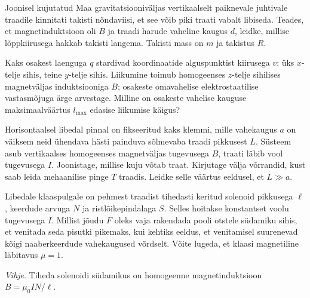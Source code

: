 \documentclass[10pt]{article}
\begin{document}
{Joonisel kujutatud Maa gravitatsiooniväljas vertikaalselt paiknevale juhtivale traadile kinnitati takisti nõndaviisi, et see võib piki traati vabalt libiseda. Teades, et magnetinduktsioon oli $B$ ja traadi harude vaheline kaugus $d$, leidke, millise lõppkiirusega hakkab takisti langema. Takisti mass on $m$ ja takistus $R$.
\probend
\bigskip


Kaks osakest laenguga $q$ stardivad koordinaatide alguspunktist kiirusega $v$:
üks $x$-telje sihis, teine $y$-telje sihis.
Liikumine toimub homogeenses $z$-telje sihilises magnetväljas induktsiooniga
$B$; osakeste omavahelise
elektrostaatilise vastasmõjuga ärge arvestage. Milline on osakeste vahelise
kauguse maksimaalväärtus $l_{\max}$ edasise liikumise käigus?
\probend
\bigskip


Horisontaalsel libedal pinnal on fikseeritud kaks klemmi, mille vahekaugus $a$ on väiksem neid ühendava hästi painduva sõlmevaba traadi pikkusest $L$. Süsteem asub vertikaalses homogeenses magnetväljas tugevusega $B$, traati läbib vool tugevusega $I$. Joonistage, millise kuju võtab traat. Kirjutage välja võrrandid, kust saab leida mehaanilise pinge $T$ traadis. Leidke selle väärtus eeldusel, et $L \gg a$.
\probend
\bigskip


Libedale klaaspulgale on pehmest traadist tihedasti keritud solenoid pikkusega $\ell$, keerdude arvuga $N$ ja ristlõikepindalaga $S$. Selles hoitakse konstantset voolu tugevusega $I$. Millist jõudu $F$ oleks vaja rakendada pooli otstele südamiku sihis, et venitada seda pisutki pikemaks, kui kehtiks eeldus, et venitamisel suurenevad kõigi naaberkeerdude vahekaugused võrdselt. Võite lugeda, et klaasi magnetiline läbitavus $\mu = 1$. 

\emph{Vihje}. Tiheda solenoidi südamikus on homogeenne magnetinduktsioon$ B = \mu_0IN/\ell$.
\probend
\bigskip


}
\end{document}
